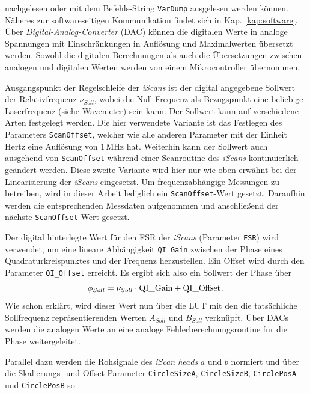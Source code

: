 nachgelesen oder mit dem Befehls-String \lstinline|VarDump| ausgelesen werden
können. Näheres zur softwareseitigen Kommunikation findet sich in Kap.
\ref{kap:software}. Über \textit{Digital-Analog-Converter} (DAC) können die
digitalen Werte in analoge Spannungen mit Einschränkungen in Auflösung und
Maximalwerten übersetzt werden. Sowohl die digitalen Berechnungen als auch
die Übersetzungen zwischen analogen und digitalen Werten werden von einem
Mikrocontroller übernommen.\par
Ausgangspunkt der Regelschleife der \textit{iScans} ist der digital angegebene
Sollwert der Relativfrequenz $\nu_{Soll}$, wobei die Null-Frequenz als Bezugspunkt eine
beliebige Laserfrequenz (siehe Wavemeter) sein kann. Der Sollwert kann auf
verschiedene Arten festgelegt werden. Die hier verwendete Variante ist das
Festlegen des Parameters \lstinline|ScanOffset|, welcher wie alle anderen
Parameter mit der Einheit Hertz eine Auflösung von $1\,$MHz hat. Weiterhin kann der Sollwert auch
ausgehend von \lstinline|ScanOffset| während einer Scanroutine des
\textit{iScans} kontinuierlich geändert werden. Diese zweite Variante wird hier
nur wie oben erwähnt bei der Linearisierung der \textit{iScans} eingesetzt. Um
frequenzabhängige Messungen zu betreiben, wird in dieser Arbeit lediglich ein
\lstinline|ScanOffset|-Wert gesetzt. Daraufhin werden die entsprechenden
Messdaten aufgenommen und anschließend der nächste \lstinline|ScanOffset|-Wert
gesetzt.\par
Der digital hinterlegte Wert für den FSR der \textit{iScans} (Parameter
\lstinline|FSR|) wird verwendet, um eine lineare Abhängigkeit
\lstinline|QI_Gain| zwischen der Phase eines Quadraturkreispunktes und der
Frequenz herzustellen. Ein Offset wird durch den Parameter \lstinline|QI_Offset| erreicht. Es ergibt sich also ein Sollwert der Phase über
\begin{equation}\label{eq:iscan_soll_phase_berechnung}
	\phi_{Soll}=\nu_{Soll}\cdot\text{\lstinline|QI_Gain|}+\text{\lstinline|QI_Offset|}\,.
\end{equation}
Wie schon erklärt, wird dieser Wert nun über die LUT mit den die tatsächliche
Sollfrequenz repräsentierenden Werten $A_{Soll}$ und $B_{Soll}$ verknüpft. Über
DACs werden die analogen Werte an eine analoge Fehlerberechnungsroutine für die
Phase weitergeleitet.\par
Parallel dazu werden die Rohsignale des \textit{iScan heads} $a$ und $b$
normiert und über die Skalierungs- und Offset-Parameter \lstinline|CircleSizeA|,
\lstinline|CircleSizeB|, \lstinline|CirclePosA| und \lstinline|CirclePosB| so
